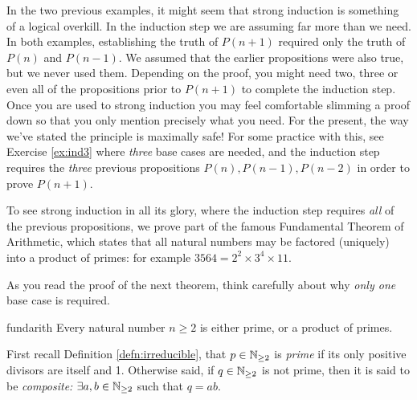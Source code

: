 In the two previous examples, it might seem that strong induction is something of a logical overkill. In the induction step we are assuming far more than we need. In both examples, establishing the truth of $P(n+1)$ required only the truth of $P(n)$ and $P(n-1)$. We assumed that the earlier propositions were also true, but we never used them. Depending on the proof, you might need two, three or even all of the propositions prior to $P(n+1)$ to complete the induction step. Once you are used to strong induction you may feel comfortable slimming a proof down so that you only mention precisely what you need. For the present, the way we've stated the principle is maximally safe! For some practice with this, see Exercise \ref{ex:ind3} where \emph{three} base cases are needed, and the induction step requires the \emph{three} previous propositions $P(n),P(n-1),P(n-2)$ in order to prove $P(n+1)$.\par

To see strong induction in all its glory, where the induction step requires \emph{all} of the previous propositions, we prove part of the famous Fundamental Theorem of Arithmetic, which states that all natural numbers may be factored (uniquely) into a product of primes: for example $3564=2^2\times 3^4\times 11$.



As you read the proof of the next theorem, think carefully about why \emph{only one} base case is required.

\begin{thm}{}{fundarith}
	Every natural number $n\ge 2$ is either prime, or a product of primes.
\end{thm}

First recall Definition \ref{defn:irreducible}, that $p\in\mathbb{N}_{\ge 2}$ is \emph{prime} if its only positive divisors are itself and 1. Otherwise said, if $q\in\mathbb{N}_{\ge 2}$ is not prime, then it is said to be \emph{composite:} $\exists a,b\in\mathbb{N}_{\ge 2}$ such that $q=ab$.

